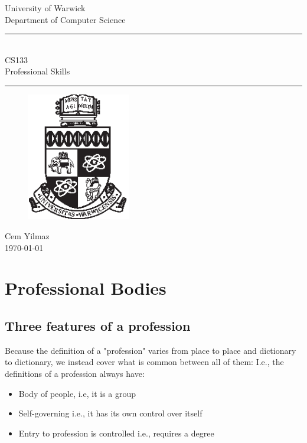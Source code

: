 \documentclass[a4paper]{article}
\theoremstyle{plain}
\theoremstyle{definition}
\theoremstyle{remark}
\begin{document}
\begin{titlepage}
\begin{center}
\large
University of Warwick \\
Department of Computer Science \\
\huge
\vspace{50mm}
\rule{\linewidth}{0.5pt} \\
CS133 \\
\vspace{5mm}
\Large
Professional Skills
\rule{\linewidth}{0.5pt}
\vspace{5mm}
\begin{figure}[H]
\centering
\includegraphics[width=0.4\textwidth]{crest_black.eps}
\end{figure}
\vspace{37mm}
Cem Yilmaz\\
\today
\end{center}
\end{titlepage}
\tableofcontents
\newpage
\section{Professional Bodies}
\subsection{Three features of a profession}
Because the definition of a "profession" varies from place to place and dictionary to dictionary, we instead cover what is common between all of them: I.e., the definitions of a profession always have:
\begin{itemize}
	\item Body of people, i.e, it is a group
	\item Self-governing i.e., it has its own control over itself
	\item Entry to profession is controlled i.e., requires a degree
\end{itemize}
\end{document}
